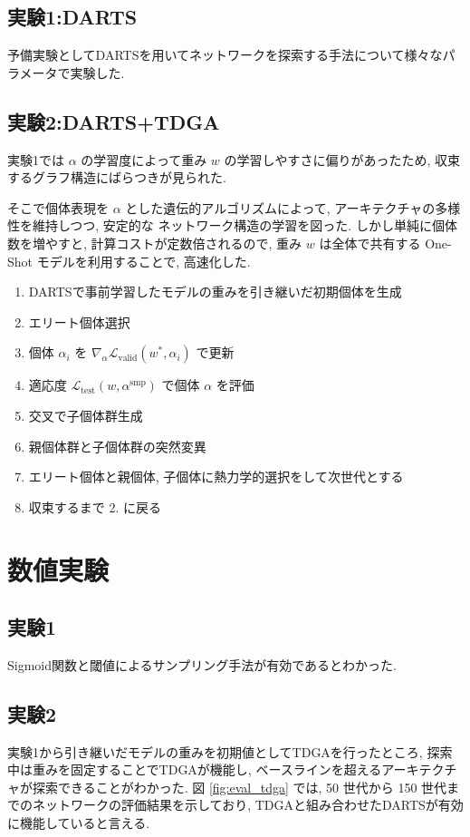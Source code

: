 \documentclass[a4paper,twoside,twocolumn,10pt]{article}
\begin{document}
\subsection{実験1:DARTS}
予備実験としてDARTSを用いてネットワークを探索する手法について様々なパラメータで実験した.

\subsection{実験2:DARTS+TDGA}

実験1では $\alpha$ の学習度によって重み $w$ の学習しやすさに偏りがあったため,
収束するグラフ構造にばらつきが見られた.

そこで個体表現を $\alpha$ とした遺伝的アルゴリズムによって,
アーキテクチャの多様性を維持しつつ, 安定的な
ネットワーク構造の学習を図った.
しかし単純に個体数を増やすと, 計算コストが定数倍されるので,
重み $w$ は全体で共有する One-Shot モデルを利用することで,
高速化した.

\begin{enumerate}
  \item DARTSで事前学習したモデルの重みを引き継いだ初期個体を生成
  \item エリート個体選択
  \item 個体 $\alpha_i$ を $\displaystyle \nabla_\alpha \mathcal{L}_{\mathrm{valid}}(w^*, \alpha_i)$ で更新
  \item 適応度 $\displaystyle \mathcal{L}_{\mathrm{test}}(w, \alpha^\mathrm{smp})$ で個体 $\alpha$ を評価
  \item 交叉で子個体群生成
  \item 親個体群と子個体群の突然変異
  \item エリート個体と親個体, 子個体に熱力学的選択をして次世代とする
  \item 収束するまで 2. に戻る
\end{enumerate}


\section{数値実験}
\subsection{実験1}
Sigmoid関数と閾値によるサンプリング手法が有効であるとわかった.

\subsection{実験2}
実験1から引き継いだモデルの重みを初期値としてTDGAを行ったところ,
探索中は重みを固定することでTDGAが機能し, ベースラインを超えるアーキテクチャが探索できることがわかった.
図 \ref{fig:eval_tdga} では, 50 世代から 150 世代までのネットワークの評価結果を示しており,
TDGAと組み合わせたDARTSが有効に機能していると言える.
\end{document}
